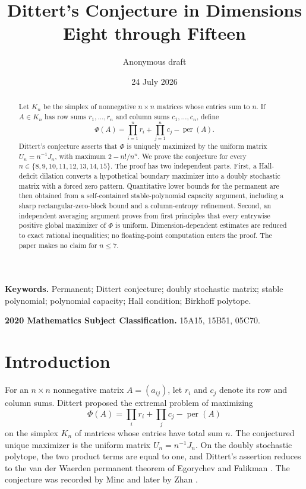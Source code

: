 \documentclass[11pt]{article}
\title{Dittert's Conjecture in Dimensions Eight through Fifteen}
\author{Anonymous draft}
\date{24 July 2026}
\theoremstyle{definition}
\newcommand{\per}{\operatorname{per}}
\newcommand{\1}{\mathbf{1}}
\begin{document}
\maketitle

\begin{abstract}
Let $K_n$ be the simplex of nonnegative $n\times n$ matrices whose entries sum to $n$.  If $A\in K_n$ has row sums $r_1,\dots,r_n$ and column sums $c_1,\dots,c_n$, define
\[
 \Phi(A)=\prod_{i=1}^n r_i+\prod_{j=1}^n c_j-\per(A).
\]
Dittert's conjecture asserts that $\Phi$ is uniquely maximized by the uniform matrix $U_n=n^{-1}J_n$, with maximum $2-n!/n^n$.  We prove the conjecture for every $n\in\{8,9,10,11,12,13,14,15\}$.  The proof has two independent parts.  First, a Hall-deficit dilation converts a hypothetical boundary maximizer into a doubly stochastic matrix with a forced zero pattern.  Quantitative lower bounds for the permanent are then obtained from a self-contained stable-polynomial capacity argument, including a sharp rectangular-zero-block bound and a column-entropy refinement.  Second, an independent averaging argument proves from first principles that every entrywise positive global maximizer of $\Phi$ is uniform.  Dimension-dependent estimates are reduced to exact rational inequalities; no floating-point computation enters the proof.  The paper makes no claim for $n\le 7$.
\end{abstract}

\noindent\textbf{Keywords.}
Permanent; Dittert conjecture; doubly stochastic matrix; stable polynomial; polynomial capacity; Hall condition; Birkhoff polytope.

\medskip
\noindent\textbf{2020 Mathematics Subject Classification.}
15A15, 15B51, 05C70.

\section{Introduction}

For an $n\times n$ nonnegative matrix $A=(a_{ij})$, let $r_i$ and $c_j$ denote its row and column sums.  Dittert proposed the extremal problem of maximizing
\[
 \Phi(A)=\prod_i r_i+\prod_j c_j-\per(A)
\]
on the simplex $K_n$ of matrices whose entries have total sum $n$.  The conjectured unique maximizer is the uniform matrix $U_n=n^{-1}J_n$.  On the doubly stochastic polytope, the two product terms are equal to one, and Dittert's assertion reduces to the van der Waerden permanent theorem of Egorychev and Falikman \cite{Egorychev1981,Falikman1981}.  The conjecture was recorded by Minc \cite{Minc1983} and later by Zhan \cite{Zhan2007}.
\end{document}
